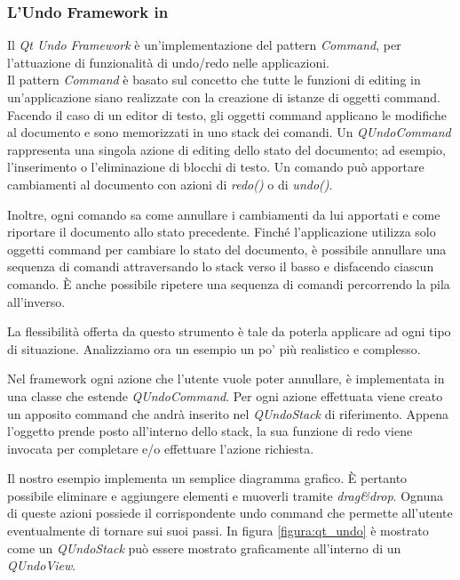 \subsubsection*{L'Undo Framework in \qt{}}
Il \emph{Qt Undo Framework} è un'implementazione del pattern \emph{Command}\cite{AUPL04}, per l'attuazione di funzionalità di undo/redo nelle applicazioni.\\
Il pattern \emph{Command} è basato sul concetto che tutte le funzioni di editing in un'applicazione siano realizzate con la creazione di istanze di oggetti command. Facendo il caso di un editor di testo, gli oggetti command applicano le modifiche al documento e sono memorizzati in uno stack dei comandi. Un \emph{QUndoCommand} rappresenta una singola azione di editing dello stato del documento; ad esempio, l'inserimento o l'eliminazione di blocchi di testo. Un comando può apportare cambiamenti al documento con azioni di \emph{redo()} o di \emph{undo()}.

Inoltre, ogni comando sa come annullare i cambiamenti da lui apportati e come riportare il documento allo stato precedente. Finché l'applicazione utilizza solo oggetti command per cambiare lo stato del documento, è possibile annullare una sequenza di comandi attraversando lo stack verso il basso e disfacendo ciascun comando. È anche possibile ripetere una sequenza di comandi percorrendo la pila all'inverso.

La flessibilità offerta da questo strumento è tale da poterla applicare ad ogni tipo di situazione. Analizziamo ora un esempio un po' più realistico e complesso.

Nel framework ogni azione che l'utente vuole poter annullare, è implementata in una classe che estende \emph{QUndoCommand}. Per ogni azione effettuata viene creato un apposito command che andrà inserito nel \emph{QUndoStack} di riferimento. Appena l'oggetto prende posto all'interno dello stack, la sua funzione di redo viene invocata per completare e/o effettuare l'azione richiesta.

Il nostro esempio implementa un semplice diagramma grafico. È pertanto possibile eliminare e aggiungere elementi e muoverli tramite \emph{drag\&{}drop}. Ognuna di queste azioni possiede il corrispondente undo command che permette all'utente eventualmente di tornare sui suoi passi.
In figura \ref{figura:qt_undo} è mostrato come un \emph{QUndoStack} può essere mostrato graficamente all'interno di un \emph{QUndoView}.

